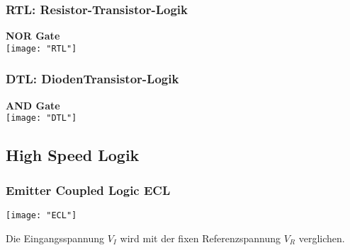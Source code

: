 \begin{minipage}[t]{0.45\textwidth}
	\vspace{0pt}								%
	\subsubsection{RTL: Resistor-Transistor-Logik}
	\textbf{NOR Gate}\\
	\texttt{[image: "RTL"]}
\end{minipage}\hspace{0.05\textwidth}
\begin{minipage}[t]{0.45\textwidth}
	\vspace{0pt}								%
	\subsubsection{DTL: DiodenTransistor-Logik}
	\textbf{AND Gate}\\
	\texttt{[image: "DTL"]}
\end{minipage}
\vspace{2mm}


\subsection{High Speed Logik}
\subsubsection{Emitter Coupled Logic ECL}
\begin{minipage}[t]{0.45\textwidth}
	\vspace{0pt}								%
	\texttt{[image: "ECL"]}
\end{minipage}\hspace{0.05\textwidth}
\begin{minipage}[t]{0.45\textwidth}
	\vspace{0pt}								%
	Die Eingangsspannung $V_I$ wird mit der fixen Referenzspannung $V_R$ verglichen.
\end{minipage}
\vspace{2mm}


